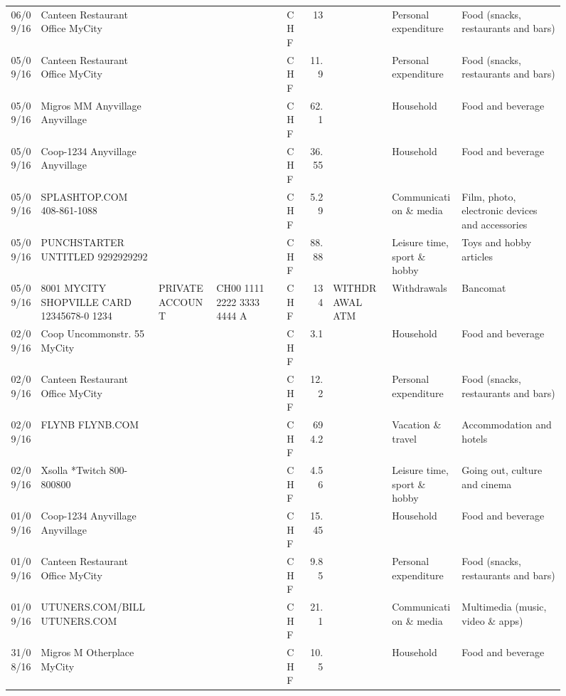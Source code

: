 \begin{landscape}
\begin{sidewaysfigure}
\begin{table}[h]
\begin{center}
\begin{tabular}{rllllrlll}
		06/09/16 & Canteen Restaurant Office      MyCity &       &       & CHF   & 13    &       & Personal expenditure & Food (snacks, restaurants and bars) \\
		05/09/16 & Canteen Restaurant Office      MyCity &       &       & CHF   & 11.9  &       & Personal expenditure & Food (snacks, restaurants and bars) \\
		05/09/16 & Migros MM Anyvillage    Anyvillage &       &       & CHF   & 62.1  &       & Household & Food and beverage \\
		05/09/16 & Coop-1234 Anyvillage    Anyvillage &       &       & CHF   & 36.55 &       & Household & Food and beverage \\
		05/09/16 & SPLASHTOP.COM            408-861-1088 &       &       & CHF   & 5.29  &       & Communication \& media & Film, photo, electronic devices and accessories \\
		05/09/16 & PUNCHSTARTER UNTITLED     9292929292 &       &       & CHF   & 88.88 &       & Leisure time, sport \& hobby & Toys and hobby articles \\
		05/09/16 & 8001 MYCITY SHOPVILLE CARD 12345678-0 1234 & PRIVATE ACCOUNT & CH00 1111 2222 3333 4444 A & CHF   & 134   & WITHDRAWAL ATM & Withdrawals & Bancomat \\
		02/09/16 & Coop Uncommonstr. 55   MyCity &       &       & CHF   & 3.1   &       & Household & Food and beverage \\
		02/09/16 & Canteen Restaurant Office      MyCity &       &       & CHF   & 12.2  &       & Personal expenditure & Food (snacks, restaurants and bars) \\
		02/09/16 & FLYNB                   FLYNB.COM &       &       & CHF   & 694.2 &       & Vacation \& travel & Accommodation and hotels \\
		02/09/16 & Xsolla *Twitch           800-800800 &       &       & CHF   & 4.56  &       & Leisure time, sport \& hobby & Going out, culture and cinema \\
		01/09/16 & Coop-1234 Anyvillage    Anyvillage &       &       & CHF   & 15.45 &       & Household & Food and beverage \\
		01/09/16 & Canteen Restaurant Office      MyCity &       &       & CHF   & 9.85  &       & Personal expenditure & Food (snacks, restaurants and bars) \\
		01/09/16 & UTUNERS.COM/BILL          UTUNERS.COM &       &       & CHF   & 21.1  &       & Communication \& media & Multimedia (music, video \& apps) \\
		31/08/16 & Migros M Otherplace   MyCity &       &       & CHF   & 10.5  &       & Household & Food and beverage \\

\end{tabular}
\end{center}
\end{table}
\end{sidewaysfigure}
\end{landscape}
